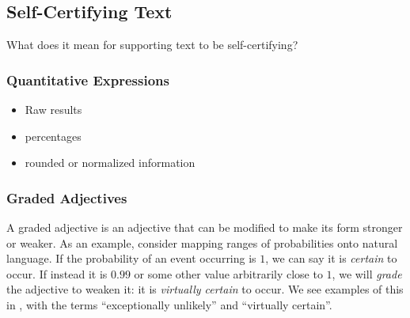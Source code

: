 \subsection{Self-Certifying Text}
What does it mean for supporting text to be self-certifying?

\subsubsection{Quantitative Expressions}
\begin{itemize}
   \item Raw results
   \item percentages
   \item rounded or normalized information
\end{itemize}

\subsubsection{Graded Adjectives}
A graded adjective is an adjective that can be modified to make its form stronger or weaker.
As an example, consider mapping ranges of probabilities onto natural language. If the probability
of an event occurring is $1$, we can say it is \emph{certain} to occur. If instead it is $0.99$
or some other value arbitrarily close to $1$, we will \emph{grade} the adjective to weaken it:
it is \emph{virtually certain} to occur. We see examples of this in ,
with the terms ``exceptionally unlikely'' and ``virtually certain''.


